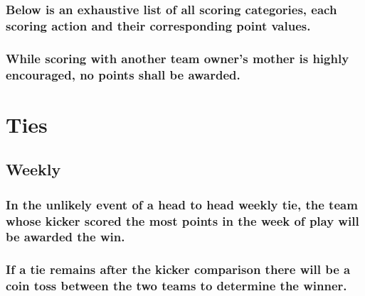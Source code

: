 \documentclass[
]{book}
\begin{document}
\hypertarget{below-is-an-exhaustive-list-of-all-scoring-categories-each-scoring-action-and-their-corresponding-point-values.}{%
\subsection{Below is an exhaustive list of all scoring categories, each scoring action and their corresponding point values.}\label{below-is-an-exhaustive-list-of-all-scoring-categories-each-scoring-action-and-their-corresponding-point-values.}}

\hypertarget{while-scoring-with-another-team-owners-mother-is-highly-encouraged-no-points-shall-be-awarded.}{%
\subsection{While scoring with another team owner's mother is highly encouraged, no points shall be awarded.}\label{while-scoring-with-another-team-owners-mother-is-highly-encouraged-no-points-shall-be-awarded.}}

\hypertarget{ties}{%
\chapter{Ties}\label{ties}}

\hypertarget{weekly}{%
\section{Weekly}\label{weekly}}

\hypertarget{in-the-unlikely-event-of-a-head-to-head-weekly-tie-the-team-whose-kicker-scored-the-most-points-in-the-week-of-play-will-be-awarded-the-win.}{%
\subsection{In the unlikely event of a head to head weekly tie, the team whose kicker scored the most points in the week of play will be awarded the win.}\label{in-the-unlikely-event-of-a-head-to-head-weekly-tie-the-team-whose-kicker-scored-the-most-points-in-the-week-of-play-will-be-awarded-the-win.}}

\hypertarget{if-a-tie-remains-after-the-kicker-comparison-there-will-be-a-coin-toss-between-the-two-teams-to-determine-the-winner.}{%
\subsection{If a tie remains after the kicker comparison there will be a coin toss between the two teams to determine the winner.}\label{if-a-tie-remains-after-the-kicker-comparison-there-will-be-a-coin-toss-between-the-two-teams-to-determine-the-winner.}}
\end{document}
